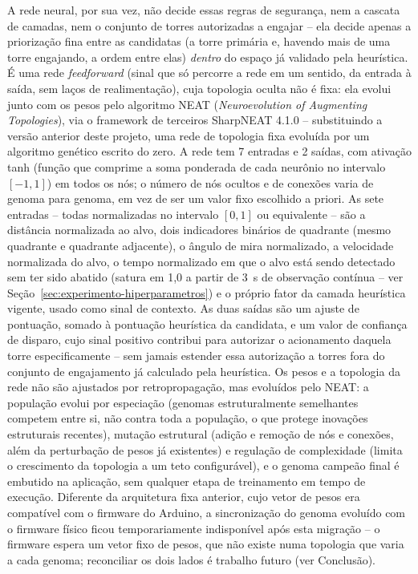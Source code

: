 \documentclass[12pt,a4paper]{article}
\begin{document}
A rede neural, por sua vez, não decide essas regras de segurança, nem a cascata de camadas, nem o
conjunto de torres autorizadas a engajar -- ela decide apenas a priorização fina entre as
candidatas (a torre primária e, havendo mais de uma torre engajando, a ordem entre elas)
\textit{dentro} do espaço já validado pela heurística. É uma rede
\textit{feedforward} (sinal que só percorre a rede em um sentido, da entrada à saída, sem laços de
realimentação), cuja topologia oculta não é fixa: ela evolui junto com os pesos pelo algoritmo NEAT
(\textit{Neuroevolution of Augmenting Topologies}), via o framework de terceiros SharpNEAT 4.1.0 --
substituindo a versão anterior deste projeto, uma rede de topologia fixa evoluída por um algoritmo
genético escrito do zero. A rede tem 7 entradas e 2 saídas, com ativação tanh (função que comprime
a soma ponderada de cada neurônio no intervalo $[-1,1]$) em todos os nós; o número de nós ocultos e
de conexões varia de genoma para genoma, em vez de ser um valor fixo escolhido a priori. As sete
entradas -- todas normalizadas no intervalo $[0,1]$ ou equivalente -- são a distância normalizada
ao alvo, dois indicadores binários de quadrante (mesmo quadrante e quadrante adjacente), o ângulo
de mira normalizado, a velocidade normalizada do alvo, o tempo normalizado em que o alvo está
sendo detectado sem ter sido abatido (satura em 1,0 a partir de 3~s de observação contínua -- ver
Seção~\ref{sec:experimento-hiperparametros}) e o próprio fator da camada heurística vigente, usado
como sinal de contexto. As duas saídas são um ajuste de pontuação, somado à pontuação heurística
da candidata, e um valor de confiança de disparo, cujo sinal positivo contribui para autorizar o
acionamento daquela torre especificamente -- sem jamais estender essa autorização a torres fora do
conjunto de engajamento já calculado pela heurística. Os pesos e a topologia da rede não são
ajustados por retropropagação, mas evoluídos pelo NEAT: a população evolui por especiação (genomas
estruturalmente semelhantes competem entre si, não contra toda a população, o que protege
inovações estruturais recentes), mutação estrutural (adição e remoção de nós e conexões, além da
perturbação de pesos já existentes) e regulação de complexidade (limita o crescimento da topologia
a um teto configurável), e o genoma campeão final é embutido na aplicação, sem qualquer etapa de
treinamento em tempo de execução. Diferente da arquitetura fixa anterior, cujo vetor de pesos era
compatível com o firmware do Arduino, a sincronização do genoma evoluído com o firmware físico
ficou temporariamente indisponível após esta migração -- o firmware espera um vetor fixo de pesos,
que não existe numa topologia que varia a cada genoma; reconciliar os dois lados é trabalho futuro
(ver Conclusão).
\end{document}
